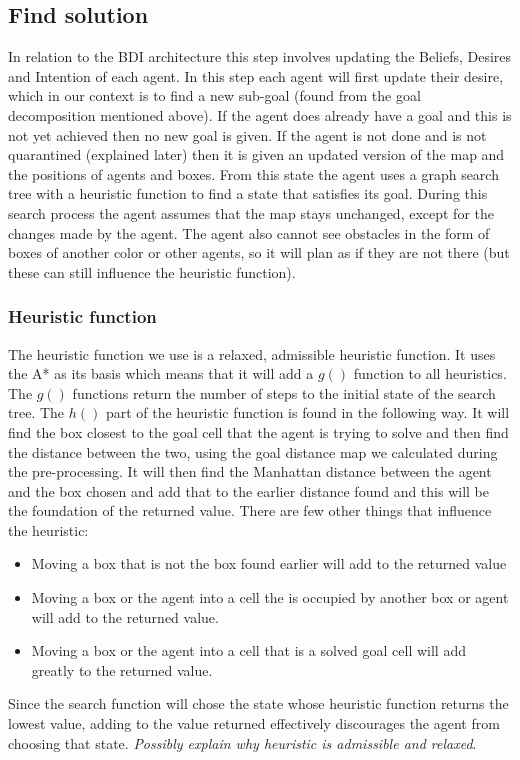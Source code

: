 \documentclass[letterpaper]{article}
\begin{document}
\subsection{Find solution}
In relation to the BDI architecture this step involves updating the Beliefs, Desires and Intention of each agent. In this step each agent will first update their desire, which in our context is to find a new sub-goal (found from the goal decomposition mentioned above). If the agent does already have a goal and this is not yet achieved then no new goal is given. If the agent is not done and is not quarantined (explained later) then it is given an updated version of the map and the positions of agents and boxes. From this state the agent uses a graph search tree with a heuristic function to find a state that satisfies its goal. During this search process the agent assumes that the map stays unchanged, except for the changes made by the agent. The agent also cannot see obstacles in the form of boxes of another color or other agents, so it will plan as if they are not there (but these can still influence the heuristic function).

\subsubsection{Heuristic function}
The heuristic function we use is a relaxed, admissible heuristic function. It uses the A* as its basis which means that it will add a $g()$ function to all heuristics. The $g()$ functions return the number of steps to the initial state of the search tree. The $h()$ part of the heuristic function is found in the following way. It will find the box closest to the goal cell that the agent is trying to solve and then find the distance between the two, using the goal distance map we calculated during the pre-processing. It will then find the Manhattan distance between the agent and the box chosen and add that to the earlier distance found and this will be the foundation of the returned value. There are few other things that influence the heuristic:
\begin{itemize}
\item Moving a box that is not the box found earlier will add to the returned value
\item Moving a box or the agent into a cell the is occupied by another box or agent will add to the returned value.
\item Moving a box or the agent into a cell that is a solved goal cell will add greatly to the returned value.
\end{itemize}
Since the search function will chose the state whose heuristic function returns the lowest value, adding to the value returned effectively discourages the agent from choosing that state. \textit{Possibly explain why heuristic is admissible and relaxed}.
\end{document}
